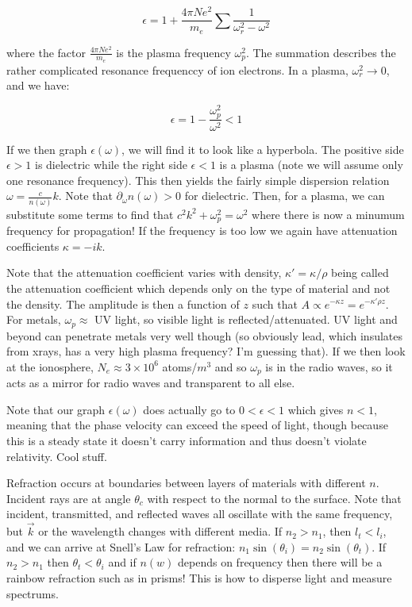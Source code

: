 \documentclass{report}
\begin{document}
$$\epsilon = 1 + \frac{4\pi Ne^2}{m_e}\sum{\frac{1}{\omega_r^2 - \omega^2}}$$

where the factor $\frac{4\pi Ne^2}{m_e}$ is the plasma frequency $\omega_p^2$. The summation describes the rather complicated resonance frequenccy of ion electrons. In a plasma, $\omega_r^2 \to 0$, and we have:

$$\epsilon = 1 - \frac{\omega_p^2}{\omega^2} < 1$$

If we then graph $\epsilon(\omega)$, we will find it to look like a hyperbola. The positive side $\epsilon > 1$ is dielectric while the right side $\epsilon < 1$ is a plasma (note we will assume only one resonance frequency). This then yields the fairly simple dispersion relation $\omega = \frac{c}{n(\omega)}k$. Note that $\partial_\omega n(\omega) > 0$ for dielectric. Then, for a plasma, we can substitute some terms to find that $c^2k^2 + \omega_p^2 = \omega^2$ where there is now a minumum frequency for propagation! If the frequency is too low we again have attenuation coefficients $\kappa = -ik$.

Note that the attenuation coefficient varies with density, $\kappa' = \kappa/\rho$ being called the attenuation coefficient which depends only on the type of material and not the density. The amplitude is then a function of $z$ such that $A \propto e^{-\kappa z} = e^{-\kappa' \rho z}$. For metals, $\omega_p \approx$ UV light, so visible light is reflected/attenuated. UV light and beyond can penetrate metals very well though (so obviously lead, which insulates from xrays, has a very high plasma frequency? I'm guessing that). If we then look at the ionosphere, $N_e \approx 3\times 10^6$ atoms/$m^3$ and so $\omega_p$ is in the radio waves, so it acts as a mirror for radio waves and transparent to all else.

Note that our graph $\epsilon(\omega)$ does actually go to $0 < \epsilon < 1$ which gives $n < 1$, meaning that the phase velocity can exceed the speed of light, though because this is a steady state it doesn't carry information and thus doesn't violate relativity. Cool stuff.

Refraction occurs at boundaries between layers of materials with different $n$. Incident rays are at angle $\theta_c$ with respect to the normal to the surface. Note that incident, transmitted, and reflected waves all oscillate with the same frequency, but $\vec{k}$ or the wavelength changes with different media. If $n_2 > n_1$, then $l_t < l_i$, and we can arrive at Snell's Law for refraction: $n_1\sin(\theta_i) = n_2\sin(\theta_t)$. If $n_2 > n_1$ then $\theta_t < \theta_i$ and if $n(w)$ depends on frequency then there will be a rainbow refraction such as in prisms! This is how to disperse light and measure spectrums. 
\end{document}
